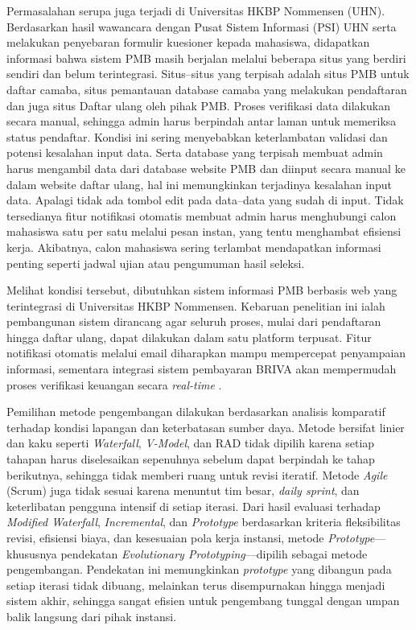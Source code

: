 Permasalahan serupa juga terjadi di Universitas HKBP Nommensen (UHN). Berdasarkan hasil wawancara dengan Pusat Sistem Informasi (PSI) UHN serta melakukan penyebaran formulir kuesioner kepada mahasiswa, didapatkan informasi bahwa sistem PMB masih berjalan melalui beberapa situs yang berdiri sendiri dan belum terintegrasi. Situs--situs yang terpisah adalah situs PMB untuk daftar camaba, situs pemantauan database camaba yang melakukan pendaftaran dan juga situs Daftar ulang oleh pihak PMB. Proses verifikasi data dilakukan secara manual, sehingga admin harus berpindah antar laman untuk memeriksa status pendaftar. Kondisi ini sering menyebabkan keterlambatan validasi dan potensi kesalahan input data. Serta database yang terpisah membuat admin harus mengambil data dari database website PMB dan diinput secara manual ke dalam website daftar ulang, hal ini memungkinkan terjadinya kesalahan input data. Apalagi tidak ada tombol edit pada data--data yang sudah di input. Tidak tersedianya fitur notifikasi otomatis membuat admin harus menghubungi calon mahasiswa satu per satu melalui pesan instan, yang tentu menghambat efisiensi kerja. Akibatnya, calon mahasiswa sering terlambat mendapatkan informasi penting seperti jadwal ujian atau pengumuman hasil seleksi.\par

Melihat kondisi tersebut, dibutuhkan sistem informasi PMB berbasis web yang terintegrasi di Universitas HKBP Nommensen. Kebaruan penelitian ini ialah pembangunan sistem dirancang agar seluruh proses, mulai dari pendaftaran hingga daftar ulang, dapat dilakukan dalam satu platform terpusat. Fitur notifikasi otomatis melalui email diharapkan mampu mempercepat penyampaian informasi, sementara integrasi sistem pembayaran BRIVA akan mempermudah proses verifikasi keuangan secara \textit{real-time} \cite{aldi2021sistem}.\par

Pemilihan metode pengembangan dilakukan berdasarkan analisis komparatif terhadap kondisi lapangan dan keterbatasan sumber daya. Metode bersifat linier dan kaku seperti \textit{Waterfall}, \textit{V-Model}, dan RAD tidak dipilih karena setiap tahapan harus diselesaikan sepenuhnya sebelum dapat berpindah ke tahap berikutnya, sehingga tidak memberi ruang untuk revisi iteratif. Metode \textit{Agile} (Scrum) juga tidak sesuai karena menuntut tim besar, \textit{daily sprint}, dan keterlibatan pengguna intensif di setiap iterasi. Dari hasil evaluasi terhadap \textit{Modified Waterfall}, \textit{Incremental}, dan \textit{Prototype} berdasarkan kriteria fleksibilitas revisi, efisiensi biaya, dan kesesuaian pola kerja instansi, metode \textit{Prototype}---khususnya pendekatan \textit{Evolutionary Prototyping}---dipilih sebagai metode pengembangan. Pendekatan ini memungkinkan \textit{prototype} yang dibangun pada setiap iterasi tidak dibuang, melainkan terus disempurnakan hingga menjadi sistem akhir, sehingga sangat efisien untuk pengembang tunggal dengan umpan balik langsung dari pihak instansi.\par

